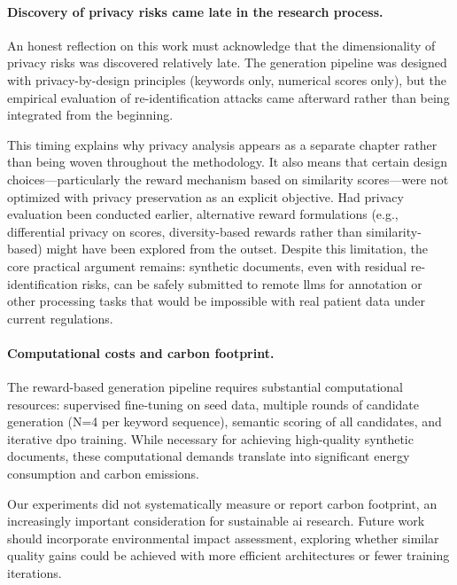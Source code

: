 \paragraph{Discovery of privacy risks came late in the research process.}

An honest reflection on this work must acknowledge that the dimensionality of privacy risks was discovered relatively late.
The generation pipeline was designed with privacy-by-design principles (keywords only, numerical scores only), but the empirical evaluation of re-identification attacks came afterward rather than being integrated from the beginning.

This timing explains why privacy analysis appears as a separate chapter rather than being woven throughout the methodology.
It also means that certain design choices—particularly the reward mechanism based on similarity scores—were not optimized with privacy preservation as an explicit objective.
Had privacy evaluation been conducted earlier, alternative reward formulations (e.g., differential privacy on scores, diversity-based rewards rather than similarity-based) might have been explored from the outset.
Despite this limitation, the core practical argument remains: synthetic documents, even with residual re-identification risks, can be safely submitted to remote \glspl{llm} for annotation or other processing tasks that would be impossible with real patient data under current regulations.

\paragraph{Computational costs and carbon footprint.}
\label{sec:carbon}

The reward-based generation pipeline requires substantial computational resources: supervised fine-tuning on seed data, multiple rounds of candidate generation (N=4 per keyword sequence), semantic scoring of all candidates, and iterative \gls{dpo} training.
While necessary for achieving high-quality synthetic documents, these computational demands translate into significant energy consumption and carbon emissions.

Our experiments did not systematically measure or report carbon footprint, an increasingly important consideration for sustainable \gls{ai} research.
Future work should incorporate environmental impact assessment, exploring whether similar quality gains could be achieved with more efficient architectures or fewer training iterations.

